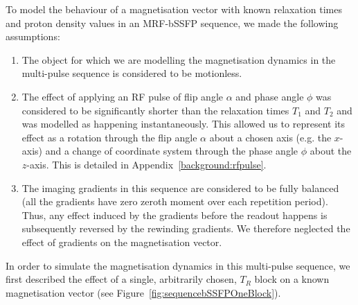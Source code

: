 \hfill

To model the behaviour of a magnetisation vector with known relaxation times and proton density values in an MRF-bSSFP sequence, we made the following assumptions:

\begin{enumerate}
    \item The object for which we are modelling the magnetisation dynamics in the multi-pulse sequence is considered to be motionless.

    \item The effect of applying an RF pulse of flip angle $\alpha$ and phase angle $\phi$ was considered to be significantly shorter than the relaxation times $T_1$ and $T_2$ and was modelled as happening instantaneously.
    This allowed us to represent its effect as a rotation through the flip angle $\alpha$ about a chosen axis (e.g. the $x$-axis) and a change of coordinate system through the phase angle $\phi$ about the $z$-axis.
    This is detailed in Appendix~\ref{background:rfpulse}.
    
    \item The imaging gradients in this sequence are considered to be fully balanced (all the gradients have zero zeroth moment over each repetition period).
    Thus, any effect induced by the gradients before the readout happens is subsequently reversed by the rewinding gradients.
    We therefore neglected the effect of gradients on the magnetisation vector.

\end{enumerate}

In order to simulate the magnetisation dynamics in this multi-pulse sequence, we first described the effect of a single, arbitrarily chosen, $T_R$ block on a known magnetisation vector (see Figure~\ref{fig:sequencebSSFPOneBlock}).

\hfill

